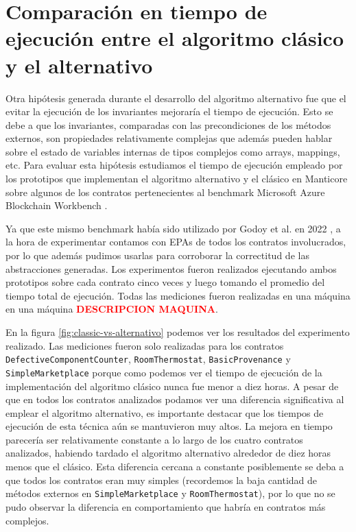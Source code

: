 \section{Comparación en tiempo de ejecución entre el algoritmo clásico y el alternativo}
Otra hipótesis generada durante el desarrollo del algoritmo alternativo fue que el evitar la ejecución de los invariantes mejoraría el tiempo de ejecución.
Esto se debe a que los invariantes, comparadas con las precondiciones de los métodos externos, son propiedades relativamente complejas que además pueden hablar sobre el estado de variables internas de tipos complejos como arrays, mappings, etc.
Para evaluar esta hipótesis estudiamos el tiempo de ejecución empleado por los prototipos que implementan el algoritmo alternativo y el clásico en Manticore sobre algunos de los contratos pertenecientes al benchmark Microsoft Azure Blockchain Workbench \cite{azure-benchmark}.

Ya que este mismo benchmark había sido utilizado por Godoy et al. en 2022 \cite{predicate-abstraction-for-smart-contract-validation}, a la hora de experimentar contamos con EPAs de todos los contratos involucrados, por lo que además pudimos usarlas para corroborar la correctitud de las abstracciones generadas.
Los experimentos fueron realizados ejecutando ambos prototipos sobre cada contrato cinco veces y luego tomando el promedio del tiempo total de ejecución.
Todas las mediciones fueron realizadas en una máquina en una máquina \textcolor{red}{\textbf{DESCRIPCION MAQUINA}}.

En la figura \ref{fig:classic-vs-alternativo} podemos ver los resultados del experimento realizado.
Las mediciones fueron solo realizadas para los contratos \texttt{DefectiveComponentCounter}, \texttt{RoomThermostat}, \texttt{BasicProvenance} y \texttt{SimpleMarketplace} porque como podemos ver el tiempo de ejecución de la implementación del algoritmo clásico nunca fue menor a diez horas.
A pesar de que en todos los contratos analizados podamos ver una diferencia significativa al emplear el algoritmo alternativo, es importante destacar que los tiempos de ejecución de esta técnica aún se mantuvieron muy altos.
La mejora en tiempo parecería ser relativamente constante a lo largo de los cuatro contratos analizados, habiendo tardado el algoritmo alternativo alrededor de diez horas menos que el clásico.
Esta diferencia cercana a constante posiblemente se deba a que todos los contratos eran muy simples (recordemos la baja cantidad de métodos externos en \texttt{SimpleMarketplace} y \texttt{RoomThermostat}), por lo que no se pudo observar la diferencia en comportamiento que habría en contratos más complejos.

